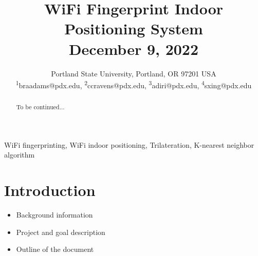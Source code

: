 \documentclass[conference]{IEEEtran}
\begin{document}
\title{WiFi Fingerprint Indoor Positioning System \\
{\footnotesize December 9, 2022}
}

\author{
  {Portland State University, Portland, OR 97201 USA} \\
  \textsuperscript{1}braadams@pdx.edu, \textsuperscript{2}ccravens@pdx.edu, \textsuperscript{3}adiri@pdx.edu, \textsuperscript{4}sxing@pdx.edu
}

\maketitle



\begin{abstract}
  To be continued...
\end{abstract}

\begin{IEEEkeywords}
  WiFi fingerprinting, WiFi indoor positioning, Trilateration, K-nearest neighbor algorithm
\end{IEEEkeywords}


\section{Introduction}
\begin{itemize}
  \item Background information
  \item Project and goal description
  \item Outline of the document

\end{itemize}
\end{document}

